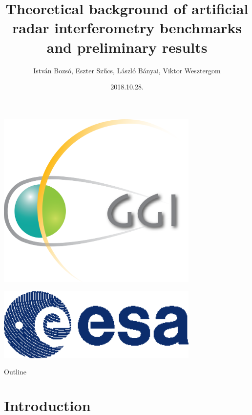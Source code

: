 \documentclass{beamer}
\title[InSAR]{Theoretical background of artificial radar interferometry benchmarks and preliminary results}
\author{István Bozsó, Eszter Szűcs, László Bányai, Viktor Wesztergom}
\institute{MTA CSFK Geodetic and Geophysical Institute}
\date{2018.10.28.}
\begin{document}
\begin{frame}
    \titlepage
    \begin{center}
        \begin{minipage}[c]{0.25\textwidth}
            \includegraphics[width=0.75\textwidth]{ggi_logo.png}
        \end{minipage}
        \hspace{30pt}
        \begin{minipage}[c]{0.25\textwidth}
            \includegraphics[width=0.75\textwidth]{esa_logo.eps}
        \end{minipage}
    \end{center}
\end{frame}

\begin{frame}{Outline}
    \tableofcontents
\end{frame}


\section{Introduction}
\end{document}
